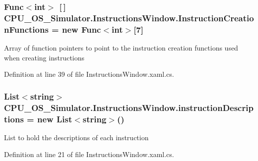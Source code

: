 \subsubsection[{Instruction\+Creation\+Functions}]{\setlength{\rightskip}{0pt plus 5cm}Func$<$int$>$ \mbox{[}$\,$\mbox{]} C\+P\+U\+\_\+\+O\+S\+\_\+\+Simulator.\+Instructions\+Window.\+Instruction\+Creation\+Functions = new Func$<$int$>$\mbox{[}7\mbox{]}\hspace{0.3cm}{\ttfamily [private]}}\label{class_c_p_u___o_s___simulator_1_1_instructions_window_ae303b32cfc2f5e7cc5ab18df94fd574b}


Array of function pointers to point to the instruction creation functions used when creating instructions 



Definition at line 39 of file Instructions\+Window.\+xaml.\+cs.

\hypertarget{class_c_p_u___o_s___simulator_1_1_instructions_window_a678ab4df2b78758142472eeed8c5d7ba}{}
\subsubsection[{instruction\+Descriptions}]{\setlength{\rightskip}{0pt plus 5cm}List$<$string$>$ C\+P\+U\+\_\+\+O\+S\+\_\+\+Simulator.\+Instructions\+Window.\+instruction\+Descriptions = new List$<$string$>$()\hspace{0.3cm}{\ttfamily [private]}}\label{class_c_p_u___o_s___simulator_1_1_instructions_window_a678ab4df2b78758142472eeed8c5d7ba}


List to hold the descriptions of each instruction 



Definition at line 21 of file Instructions\+Window.\+xaml.\+cs.

\hypertarget{class_c_p_u___o_s___simulator_1_1_instructions_window_af568f7891b3381f9bec2f0d5b2d0d8c6}{}
